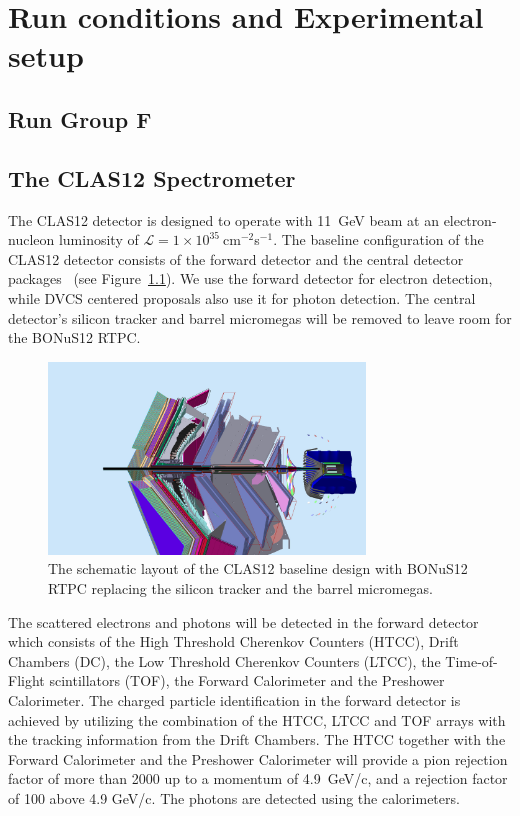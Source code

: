 \chapter{Run conditions and Experimental setup}
\label{chap:physics}


\section{Run Group F}




\section{The CLAS12 Spectrometer}
The CLAS12 detector is designed to operate with 11~GeV beam at an 
electron-nucleon luminosity of $\mathcal{L} = 
1\times10^{35}~$cm$^{-2}$s$^{-1}$. The baseline configuration of the CLAS12 
detector consists of the forward detector and the central detector 
packages~\cite{CD} (see Figure~\ref{fig:fd}). We use the forward detector
for electron detection, while DVCS centered proposals also use it for photon 
detection. The central detector's silicon tracker and barrel micromegas will be 
removed to leave room for the BONuS12 RTPC. 

\begin{figure}
  \begin{center}
    \includegraphics[angle=0, width=0.75\textwidth]{figures/clas12_bonus12.png}
    \caption{The schematic layout of the CLAS12 baseline design with BONuS12 
     RTPC replacing the silicon tracker and the barrel micromegas.}
    \label{fig:fd}
  \end{center}
\end{figure}

The scattered electrons and photons will be detected in the forward detector which consists 
of the High Threshold Cherenkov Counters (HTCC), Drift Chambers (DC), the Low 
Threshold Cherenkov Counters (LTCC), the Time-of-Flight scintillators (TOF), 
the Forward Calorimeter and the Preshower Calorimeter. The charged particle 
identification in the forward detector is achieved by utilizing the combination 
of the HTCC, LTCC and TOF arrays with the tracking information from the Drift 
Chambers. The HTCC together with the Forward Calorimeter and the Preshower 
Calorimeter will provide a pion rejection factor of more than 2000 up to a 
momentum of 4.9~GeV/c, and a rejection factor of 100 above 4.9 GeV/c. The photons
are detected using the calorimeters.

